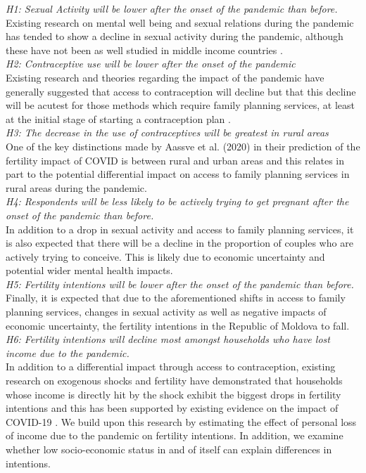 \documentclass[10pt,letterpaper]{article}
\begin{document}
\emph{H1: Sexual Activity will be lower after the onset of the pandemic than before.}
Existing research on mental well being and sexual relations during the pandemic has tended to show a decline in sexual activity during the pandemic, although these have not been as well studied in middle income countries \cite{jacob2020covid}.
\\
\emph{H2: Contraceptive use will be lower after the onset of the pandemic}\\
Existing research and theories regarding the impact of the pandemic have generally suggested that access to contraception will decline but that this decline will be acutest for those methods which require family planning services, at least at the initial stage of starting a contraception plan \cite{lindberg2020early}. 
\\
\emph{H3: The decrease in the use of contraceptives will be greatest in rural areas}\\
One of the key distinctions made by Aassve et al. (2020) in their prediction of the fertility impact of COVID is between rural and urban areas and this relates in part to the potential differential impact on access to family planning services in rural areas during the pandemic. 
\\
\emph{H4: Respondents will be less likely to be actively trying to get pregnant after the onset of the pandemic than before.}\\
In addition to a drop in sexual activity and access to family planning services, it is also expected that there will be a decline in the proportion of couples who are actively trying to conceive. This is likely due to economic uncertainty and potential wider mental health impacts. 
\\
\emph{H5: Fertility intentions will be lower after the onset of the pandemic than before.}\\
Finally, it is expected that due to the aforementioned shifts in access to family planning services, changes in sexual activity as well as negative impacts of economic uncertainty, the fertility intentions in the Republic of Moldova to fall.
\\
\emph{H6: Fertility intentions will decline most amongst households who have lost income due to the pandemic.}\\
In addition to a differential impact through access to contraception, existing research on exogenous shocks and fertility have demonstrated that households whose income is directly hit by the shock exhibit the biggest drops in fertility intentions and this has been supported by existing evidence on the impact of COVID-19 \cite{vignoli2020reflection}. We build upon this research by estimating the effect of personal loss of income due to the pandemic on fertility intentions. In addition, we examine whether low socio-economic status in and of itself can explain differences in intentions.
\end{document}
